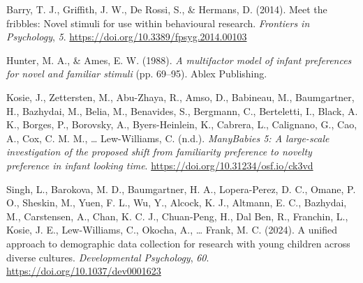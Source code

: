 \documentclass[
  letterpaper,
  DIV=11,
  numbers=noendperiod,
  oneside]{scrreprt}
\newlength{\cslhangindent}
\newenvironment{CSLReferences}[2] %
 {\begin{list}{}{%
  \setlength{\itemindent}{0pt}
  \setlength{\leftmargin}{0pt}
  \setlength{\parsep}{0pt}
  \ifodd #1
   \setlength{\leftmargin}{\cslhangindent}
   \setlength{\itemindent}{-1\cslhangindent}
  \fi
  \setlength{\itemsep}{#2\baselineskip}}}
 {\end{list}}
\begin{document}
\label{refs}
\begin{CSLReferences}{1}{0}
Barry, T. J., Griffith, J. W., De Rossi, S., \& Hermans, D. (2014). Meet
the fribbles: Novel stimuli for use within behavioural research.
\emph{Frontiers in Psychology}, \emph{5}.
\url{https://doi.org/10.3389/fpsyg.2014.00103}

Hunter, M. A., \& Ames, E. W. (1988). \emph{A multifactor model of
infant preferences for novel and familiar stimuli} (pp. 69--95). Ablex
Publishing.

Kosie, J., Zettersten, M., Abu-Zhaya, R., Amso, D., Babineau, M.,
Baumgartner, H., Bazhydai, M., Belia, M., Benavides, S., Bergmann, C.,
Berteletti, I., Black, A. K., Borges, P., Borovsky, A., Byers-Heinlein,
K., Cabrera, L., Calignano, G., Cao, A., Cox, C. M. M., \ldots{}
Lew-Williams, C. (n.d.). \emph{ManyBabies 5: A large-scale investigation
of the proposed shift from familiarity preference to novelty preference
in infant looking time}. \url{https://doi.org/10.31234/osf.io/ck3vd}

Singh, L., Barokova, M. D., Baumgartner, H. A., Lopera-Perez, D. C.,
Omane, P. O., Sheskin, M., Yuen, F. L., Wu, Y., Alcock, K. J., Altmann,
E. C., Bazhydai, M., Carstensen, A., Chan, K. C. J., Chuan-Peng, H., Dal
Ben, R., Franchin, L., Kosie, J. E., Lew-Williams, C., Okocha, A.,
\ldots{} Frank, M. C. (2024). A unified approach to demographic data
collection for research with young children across diverse cultures.
\emph{Developmental Psychology}, \emph{60}.
\url{https://doi.org/10.1037/dev0001623}

\end{CSLReferences}
\end{document}
